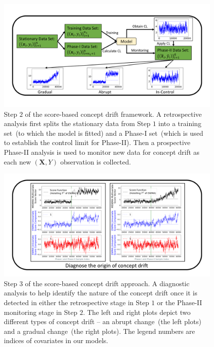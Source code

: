 \documentclass[twoside,11pt]{article}
\begin{document}
\begin{figure}
\centering
\includegraphics[width = .8\linewidth, trim=.35in .48in .35in .49in, clip]{../figures/v14/flow_chart/Monitoring_2.png}
\caption{Step $2$ of the score-based concept drift framework. A retrospective analysis first splits the stationary data from Step $1$ into a training set~(to which the model is fitted) and a Phase-I set~(which is used to establish the control limit for Phase-II). Then a prospective Phase-II analysis is used to monitor new data for concept drift as each new $(\bm{X}, Y)$ observation is collected.}
\label{fig:proc_mon_score_monitoring}
\end{figure}

\begin{figure}
\centering
\includegraphics[width = .8\linewidth, trim=.35in .21in .35in .21in, clip]{../figures/v14/flow_chart/Diagnose_2.png}
\caption{Step $3$ of the score-based concept drift approach. A diagnostic analysis to help identify the nature of the concept drift once it is detected in either the retrospective stage in Step $1$ or the Phase-II monitoring stage in Step $2$. The left and right plots depict two different types of concept drift -- an abrupt change~(the left plots) and a gradual change~(the right plots). The legend numbers are indices of covariates in our models.}
\label{fig:proc_mon_score_diagnosis}
\end{figure}
\end{document}
